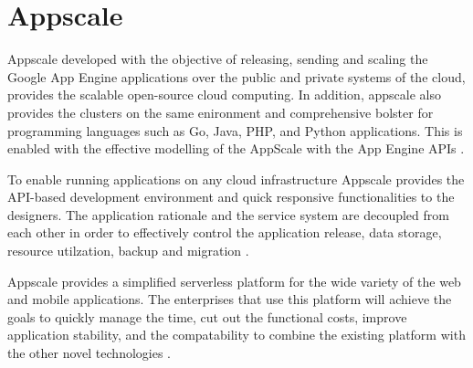 \section{Appscale}
Appscale developed with the objective of releasing, sending and scaling the Google App Engine applications over the public and private systems of the cloud, provides the scalable open-source cloud computing. In addition, appscale also provides the clusters on the same enironment and comprehensive bolster for programming languages such as Go, Java, PHP, and Python applications. This is enabled with the effective modelling 
of the AppScale with the App Engine APIs \cite{hid-sp18-412-wiki_appscale}.

To enable running applications on any cloud infrastructure Appscale provides the API-based development environment and quick responsive functionalities to the designers. The application rationale and the service system are decoupled from each other in order to effectively control the application release, data storage, resource utilzation, backup and migration \cite{hid-sp18-412-wiki_appscale}.

Appscale provides a simplified serverless platform for the wide variety of the web and mobile applications. The enterprises that use this platform will achieve the goals to quickly manage the time, cut out the functional costs, improve application stability, and the compatability to combine the existing platform with the other novel technologies \cite{hid-sp18-412-git_appscale}.


